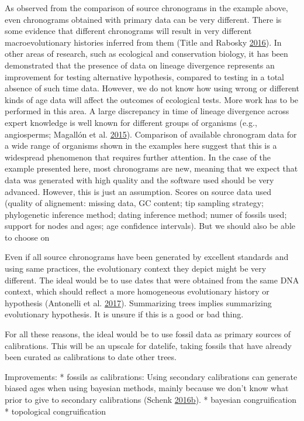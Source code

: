 \documentclass[]{article}
\begin{document}
As observed from the comparison of source chronograms in the example above, even chronograms obtained with primary data can be very different. There is some evidence that different chronograms will result in very different macroevolutionary histories inferred from them (Title and Rabosky \protect\hyperlink{ref-title2016macrophylogenies}{2016}). In other areas of research, such as ecological and conservation biology, it has been demonstrated that the presence of data on lineage divergence represents an improvement for testing alternative hypothesis, compared to testing in a total absence of such time data. However, we do not know how using wrong or different kinds of age data will affect the outcomes of ecological tests. More work has to be performed in this area.
A large discrepancy in time of lineage divergence across expert knowledge is well known for different groups of organisms (e.g., angiosperms; Magallón et al. \protect\hyperlink{ref-magallon2015metacalibrated}{2015}). Comparison of available chronogram data for a wide range of organisms shown in the examples here suggest that this is a widespread phenomenon that requires further attention.
In the case of the example presented here, most chronograms are new, meaning that we expect that data was generated with high quality and the software used should be very advanced. However, this is just an assumption. Scores on source data used (quality of alignement: missing data, GC content; tip sampling strategy; phylogenetic inference method; dating inference method; numer of fossils used; support for nodes and ages; age confidence intervals). But we should also be able to choose on

Even if all source chronograms have been generated by excellent standards and using same practices, the evolutionary context they depict might be very different.
The ideal would be to use dates that were obtained from the same DNA context, which should reflect a more homogeneous evolutionary history or hypothesis (Antonelli et al. \protect\hyperlink{ref-antonelli2017supersmart}{2017}). Summarizing trees implies summarizing evolutionary hypothesis. It is unsure if this is a good or bad thing.

For all these reasons, the ideal would be to use fossil data as primary sources of calibrations. This will be an upscale for datelife, taking fossils that have already been curated as calibrations to date other trees.

Improvements:
* fossils as calibrations: Using secondary calibrations can generate biased ages when using bayesian methods, mainly because we don't know what prior to give to secondary calibrations
(Schenk \protect\hyperlink{ref-Schenk2016}{2016}\protect\hyperlink{ref-Schenk2016}{b}).
* bayesian congruification
* topological congruification
\end{document}
